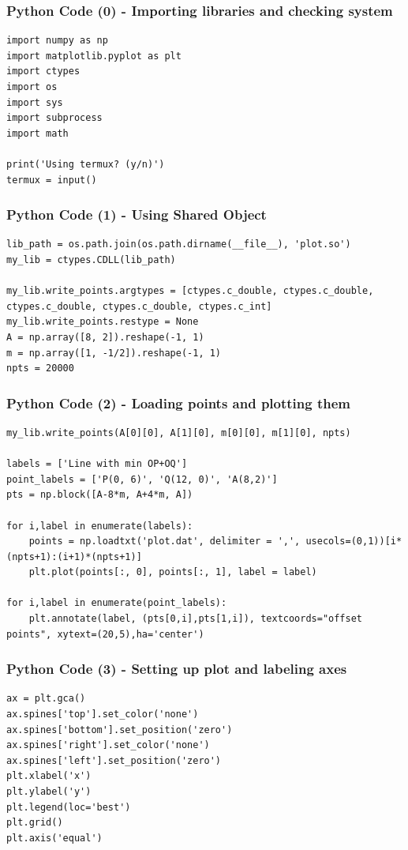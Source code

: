 \documentclass{beamer}
\begin{document}
\begin{frame}[fragile]
    \frametitle{Python Code (0) - Importing libraries and checking system}
    \begin{lstlisting}
import numpy as np
import matplotlib.pyplot as plt
import ctypes
import os
import sys
import subprocess
import math

print('Using termux? (y/n)')
termux = input()
\end{lstlisting}
\end{frame}

\begin{frame}[fragile]
    \frametitle{Python Code (1) - Using Shared Object}
    \begin{lstlisting}
lib_path = os.path.join(os.path.dirname(__file__), 'plot.so')
my_lib = ctypes.CDLL(lib_path)

my_lib.write_points.argtypes = [ctypes.c_double, ctypes.c_double, ctypes.c_double, ctypes.c_double, ctypes.c_int]
my_lib.write_points.restype = None
A = np.array([8, 2]).reshape(-1, 1)
m = np.array([1, -1/2]).reshape(-1, 1)
npts = 20000
\end{lstlisting}
\end{frame}

\begin{frame}[fragile]
    \frametitle{Python Code (2) - Loading points and plotting them}
    \begin{lstlisting}
my_lib.write_points(A[0][0], A[1][0], m[0][0], m[1][0], npts)

labels = ['Line with min OP+OQ']
point_labels = ['P(0, 6)', 'Q(12, 0)', 'A(8,2)']
pts = np.block([A-8*m, A+4*m, A])

for i,label in enumerate(labels):
    points = np.loadtxt('plot.dat', delimiter = ',', usecols=(0,1))[i*(npts+1):(i+1)*(npts+1)]
    plt.plot(points[:, 0], points[:, 1], label = label)

for i,label in enumerate(point_labels):
    plt.annotate(label, (pts[0,i],pts[1,i]), textcoords="offset points", xytext=(20,5),ha='center')
\end{lstlisting}
\end{frame}

\begin{frame}[fragile]
    \frametitle{Python Code (3) - Setting up plot and labeling axes}
    \begin{lstlisting}
ax = plt.gca()
ax.spines['top'].set_color('none')
ax.spines['bottom'].set_position('zero')
ax.spines['right'].set_color('none')
ax.spines['left'].set_position('zero')
plt.xlabel('x')
plt.ylabel('y')
plt.legend(loc='best')
plt.grid()
plt.axis('equal')
    \end{lstlisting}
\end{frame}
\end{document}
